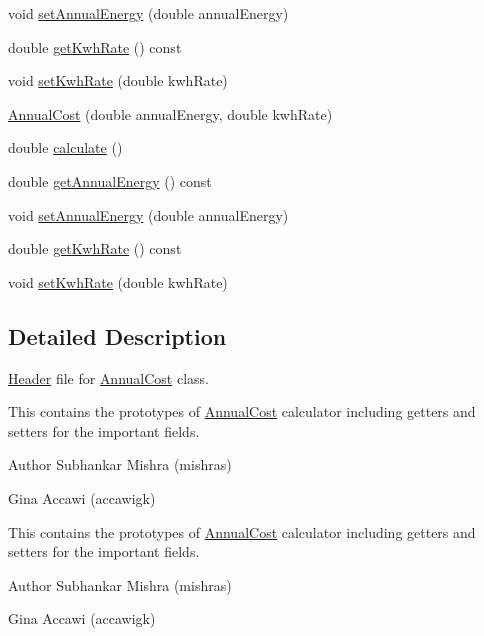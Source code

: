 \begin{DoxyCompactItemize}
void \hyperlink{class_annual_cost_a4379cc7b591abefb2302d74c57227357}{set\+Annual\+Energy} (double annual\+Energy)
\item 
double \hyperlink{class_annual_cost_ac01ed415360b6f52f61ec8a581333c29}{get\+Kwh\+Rate} () const
\item 
void \hyperlink{class_annual_cost_a45a1259c9912c7202dff446c290210e9}{set\+Kwh\+Rate} (double kwh\+Rate)
\item 
\hyperlink{class_annual_cost_a723513a7074d1799e2bf410b60b3146f}{Annual\+Cost} (double annual\+Energy, double kwh\+Rate)
\item 
double \hyperlink{class_annual_cost_adb12b66af50d01746c3f6f0d430b1fdd}{calculate} ()
\item 
double \hyperlink{class_annual_cost_a0e217b7df05e6a03503e14d96570a192}{get\+Annual\+Energy} () const
\item 
void \hyperlink{class_annual_cost_a4379cc7b591abefb2302d74c57227357}{set\+Annual\+Energy} (double annual\+Energy)
\item 
double \hyperlink{class_annual_cost_ac01ed415360b6f52f61ec8a581333c29}{get\+Kwh\+Rate} () const
\item 
void \hyperlink{class_annual_cost_a45a1259c9912c7202dff446c290210e9}{set\+Kwh\+Rate} (double kwh\+Rate)
\end{DoxyCompactItemize}


\subsection{Detailed Description}
\hyperlink{class_header}{Header} file for \hyperlink{class_annual_cost}{Annual\+Cost} class. 

This contains the prototypes of \hyperlink{class_annual_cost}{Annual\+Cost} calculator including getters and setters for the important fields.

\begin{DoxyAuthor}{Author}
Subhankar Mishra (mishras) 

Gina Accawi (accawigk) 
\end{DoxyAuthor}


This contains the prototypes of \hyperlink{class_annual_cost}{Annual\+Cost} calculator including getters and setters for the important fields.

\begin{DoxyAuthor}{Author}
Subhankar Mishra (mishras) 

Gina Accawi (accawigk) 
\end{DoxyAuthor}


